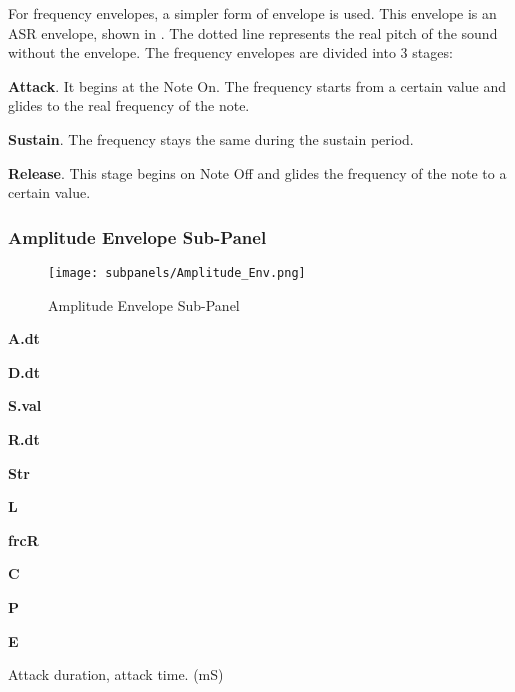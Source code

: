    For frequency envelopes, a simpler form of envelope is used.
   This envelope is an ASR envelope, shown in
   .
   The dotted line represents the real pitch of the sound without the envelope.
   The frequency envelopes are divided into 3 stages:

   \begin{enumber}
      \item \textbf{Attack}.
      It begins at the Note On. The frequency starts from a certain value and
      glides to the real frequency of the note.
      \item \textbf{Sustain}.
      The frequency stays the same during the sustain period.
      \item \textbf{Release}.
      This stage begins on Note Off and glides the frequency of the note to a
      certain value.
   \end{enumber}

\subsubsection{Amplitude Envelope Sub-Panel}
\label{subsubsec:amplitude_envelope_subpanel}

\begin{figure}[H]
   \centering
   \texttt{[image: subpanels/Amplitude\_Env.png]}
   \caption[Amplitude Envelope Sub-Panel]{Amplitude Envelope Sub-Panel}
   \label{fig:amplitude_env}
\end{figure}

   \begin{enumber}
      \item \textbf{A.dt}
      \item \textbf{D.dt}
      \item \textbf{S.val}
      \item \textbf{R.dt}
      \item \textbf{Str}
      \item \textbf{L}
      \item \textbf{frcR}
      \item \textbf{C}
      \item \textbf{P}
      \item \textbf{E}
   \end{enumber}

   \setcounter{ItemCounter}{0}      %

   Attack duration, attack time. (mS)

